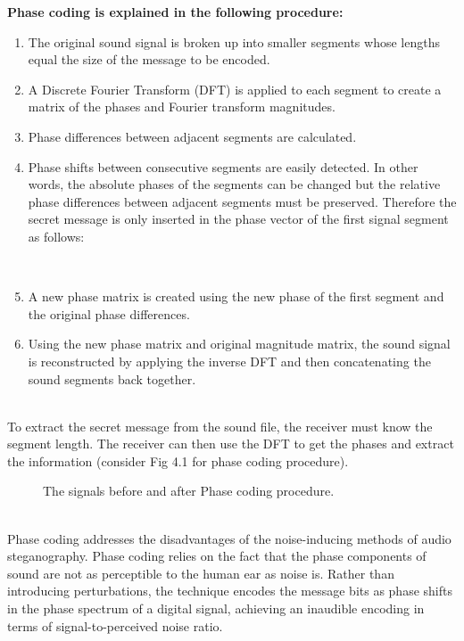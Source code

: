 \documentclass[a4paper, 12pt, notitlepage]{report}
\begin{document}
\begin{block}{\textbf{Phase coding is explained in the following procedure:}}
\begin{enumerate}
  \item {
    The original sound signal is broken up into smaller segments whose lengths equal the size of the message to be encoded.  
  }
	\item {
		A Discrete Fourier Transform (DFT) is applied to each segment to create a matrix of the phases and Fourier transform magnitudes. 
  }
	\item {
    Phase differences between adjacent segments are calculated.}
	\item {
    Phase shifts between consecutive segments are easily detected. In other words, the absolute phases of the segments can be changed but the relative phase differences between adjacent segments must be preserved. Therefore the secret message is only inserted in the phase vector of the first signal segment as follows:}
		
\begin{figure}[h!]
{\par}
\end{figure}\\

	\item A new phase matrix is created using the new phase of the first segment and the original phase differences.  
	\item Using the new phase matrix and original magnitude matrix, the sound signal is reconstructed by applying the inverse DFT and then concatenating the sound segments back together.  
  \end{enumerate}
\end{block}\\

To extract the secret message from the sound file, the receiver must know the segment length. The receiver can then use the DFT to get the phases and extract the information (consider Fig 4.1 for phase coding procedure).\\

\begin{figure}[h!]
{\par}
\caption{The signals before and after Phase coding procedure.}
\end{figure}\\

Phase  coding  addresses  the  disadvantages  of  the  noise-inducing methods of audio steganography. Phase coding relies on  the  fact  that  the  phase  components  of  sound  are  not  as perceptible  to  the  human  ear  as  noise  is.  Rather  than 
introducing  perturbations,  the  technique  encodes  the  message bits  as  phase  shifts  in  the  phase  spectrum  of  a  digital  signal, achieving an inaudible encoding in terms of signal-to-perceived noise ratio.\\
\end{document}
